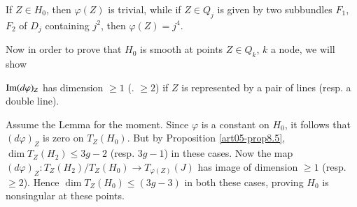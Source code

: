 \begin{lemma}\label{art05-lem8.10}
If $Z\in H_{0}$, then $\varphi(Z)$ is trivial, while if $Z\in Q_{j}$
is given by two subbundles $F_{1}$, $F_{2}$ of $D_{j}$ containing
$j^{2}$, then $\varphi(Z)=j^{4}$. 
\end{lemma}

Now in order to prove that $H_{0}$ is smooth at points $Z\in Q_{k}$,
$k$ a node, we will show

\begin{lemma}\label{art05-lem8.11}
$\operatorname{Im} (d\varphi)_{Z}$ has dimension $\geq 1$ (\resp. $\geq 2$) if $Z$
is represented by a pair of lines (resp. a double line).
\end{lemma}

Assume the Lemma for the moment. Since $\varphi$ is a constant on
$H_{0}$, it follows that $(d\varphi)_{Z}$ is zero on
$T_{Z}(H_{0})$. But by Proposition \ref{art05-prop8.5}, $\dim
T_{Z}(H_{2})\leq 3g-2$ (resp. $3g-1$) in these cases. Now the map
$(d\varphi)_{Z}:T_{Z}(H_{2})/T_{Z}(H_{0})\to T_{\varphi(Z)}(J)$ has
image of dimension $\geq 1$ (resp. $\geq 2$). Hence $\dim
T_{Z}(H_{0})\leq (3g-3)$ in both these cases, proving $H_{0}$ is
nonsingular at these points.

